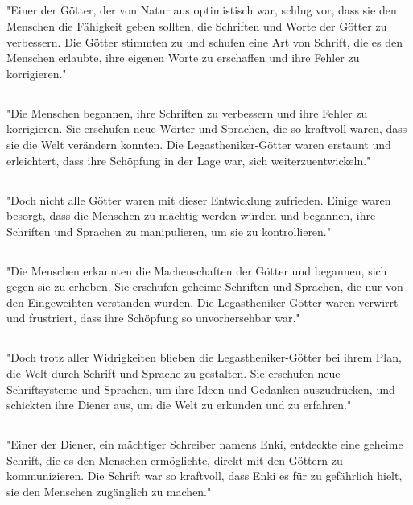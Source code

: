 \documentclass{article}
\begin{document}
\subsection{}
"Einer der Götter, der von Natur aus optimistisch war, schlug vor, dass sie den Menschen die Fähigkeit geben sollten, die Schriften und Worte der Götter zu verbessern. Die Götter stimmten zu und schufen eine Art von Schrift, die es den Menschen erlaubte, ihre eigenen Worte zu erschaffen und ihre Fehler zu korrigieren."
\subsection{}
"Die Menschen begannen, ihre Schriften zu verbessern und ihre Fehler zu korrigieren. Sie erschufen neue Wörter und Sprachen, die so kraftvoll waren, dass sie die Welt verändern konnten. Die Legastheniker-Götter waren erstaunt und erleichtert, dass ihre Schöpfung in der Lage war, sich weiterzuentwickeln."
\subsection{}
"Doch nicht alle Götter waren mit dieser Entwicklung zufrieden. Einige waren besorgt, dass die Menschen zu mächtig werden würden und begannen, ihre Schriften und Sprachen zu manipulieren, um sie zu kontrollieren."
\subsection{}
"Die Menschen erkannten die Machenschaften der Götter und begannen, sich gegen sie zu erheben. Sie erschufen geheime Schriften und Sprachen, die nur von den Eingeweihten verstanden wurden. Die Legastheniker-Götter waren verwirrt und frustriert, dass ihre Schöpfung so unvorhersehbar war."
\subsection{}
"Doch trotz aller Widrigkeiten blieben die Legastheniker-Götter bei ihrem Plan, die Welt durch Schrift und Sprache zu gestalten. Sie erschufen neue Schriftsysteme und Sprachen, um ihre Ideen und Gedanken auszudrücken, und schickten ihre Diener aus, um die Welt zu erkunden und zu erfahren."
\subsection{}
"Einer der Diener, ein mächtiger Schreiber namens Enki, entdeckte eine geheime Schrift, die es den Menschen ermöglichte, direkt mit den Göttern zu kommunizieren. Die Schrift war so kraftvoll, dass Enki es für zu gefährlich hielt, sie den Menschen zugänglich zu machen."
\end{document}
